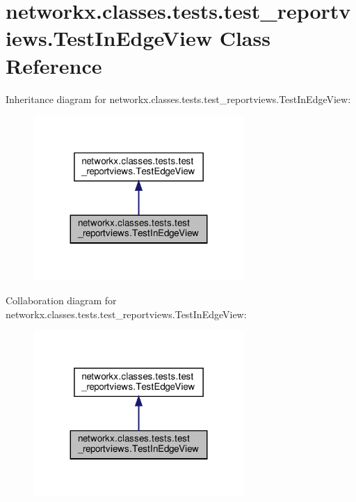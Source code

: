 \hypertarget{classnetworkx_1_1classes_1_1tests_1_1test__reportviews_1_1TestInEdgeView}{}\section{networkx.\+classes.\+tests.\+test\+\_\+reportviews.\+Test\+In\+Edge\+View Class Reference}
\label{classnetworkx_1_1classes_1_1tests_1_1test__reportviews_1_1TestInEdgeView}


Inheritance diagram for networkx.\+classes.\+tests.\+test\+\_\+reportviews.\+Test\+In\+Edge\+View\+:
\nopagebreak
\begin{figure}[H]
\begin{center}
\leavevmode
\includegraphics[width=227pt]{classnetworkx_1_1classes_1_1tests_1_1test__reportviews_1_1TestInEdgeView__inherit__graph}
\end{center}
\end{figure}


Collaboration diagram for networkx.\+classes.\+tests.\+test\+\_\+reportviews.\+Test\+In\+Edge\+View\+:
\nopagebreak
\begin{figure}[H]
\begin{center}
\leavevmode
\includegraphics[width=227pt]{classnetworkx_1_1classes_1_1tests_1_1test__reportviews_1_1TestInEdgeView__coll__graph}
\end{center}
\end{figure}
